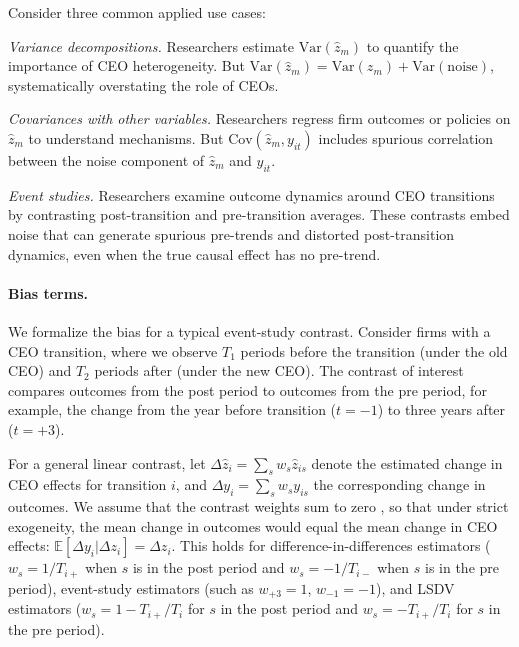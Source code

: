 \documentclass[11pt,a4paper]{article}
\newcommand{\Var}{\text{Var}}
\newcommand{\Cov}{\text{Cov}}
\begin{document}
Consider three common applied use cases:

\textit{Variance decompositions.} Researchers estimate $\Var(\hat z_m)$ to quantify the importance of CEO heterogeneity. But $\Var(\hat z_m) = \Var(z_m) + \Var(\text{noise})$, systematically overstating the role of CEOs.

\textit{Covariances with other variables.} Researchers regress firm outcomes or policies on $\hat z_m$ to understand mechanisms. But $\Cov(\hat z_m, y_{it})$ includes spurious correlation between the noise component of $\hat z_m$ and $y_{it}$.

\textit{Event studies.} Researchers examine outcome dynamics around CEO transitions by contrasting post-transition and pre-transition averages. These contrasts embed noise that can generate spurious pre-trends and distorted post-transition dynamics, even when the true causal effect has no pre-trend.

\paragraph{Bias terms.} We formalize the bias for a typical event-study contrast. Consider firms with a CEO transition, where we observe $T_1$ periods before the transition (under the old CEO) and $T_2$ periods after (under the new CEO). The contrast of interest compares outcomes from the post period to outcomes from the pre period, for example, the change from the year before transition ($t=-1$) to three years after ($t=+3$). 

For a general linear contrast, let $\Delta \hat z_i = \sum_s w_s \hat z_{is}$ denote the estimated change in CEO effects for transition $i$, and $\Delta y_i = \sum_s w_s y_{is}$ the corresponding change in outcomes. We assume that the contrast weights sum to zero , so that under strict exogeneity, the mean change in outcomes would equal the mean change in CEO effects: $\mathbb E[\Delta y_i|\Delta z_i] = \Delta z_i$. This holds for difference-in-differences estimators ($w_s = 1/T_{i+}$ when $s$ is in the post period and $w_s = -1/T_{i-}$ when $s$ is in the pre period), event-study estimators (such as $w_{+3}=1$, $w_{-1}=-1$), and LSDV estimators ($w_s = 1-T_{i+}/T_i$ for $s$ in the post period and $w_s = -T_{i+}/T_i$ for $s$ in the pre period).
\end{document}
